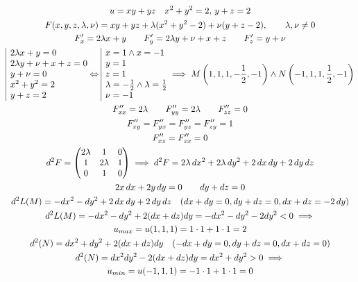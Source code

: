 \documentclass[a4paper,fleqn,12pt]{article}
\theoremstyle{definition}
\begin{document}
\begin{gather*}
u = xy+yz \quad x^2 + y^2 = 2, \, y+z = 2 \\
F(x,y,z,\lambda, \nu) = xy + yz + \lambda(x^2 + y^2 - 2) + \nu(y + z - 2), \qquad \lambda, \nu \neq 0 \\
F'_x = 2\lambda x + y \qquad F'_y = 2 \lambda y + \nu + x + z \qquad F'_z = y + \nu \\
\begin{array}{|l@{}}
2\lambda x + y = 0 \\
2 \lambda y + \nu + x + z  = 0 \\
y + \nu = 0 \\
x^2 + y^2 = 2 \\
y+z = 2 
\end{array} \Leftrightarrow 
\begin{array}{|l@{}}
x = 1 \land x = -1\\
y = 1 \\
z = 1 \\
\lambda = - \frac{1}{2} \land \lambda = \frac{1}{2} \\
\nu = -1
\end{array} \implies M \left(1,1,1,-\frac{1}{2}, -1 \right) \land N \left(-1,1,1,\frac{1}{2}, -1 \right) \\
F''_{xx} = 2\lambda \qquad F''_{yy} = 2\lambda \qquad F''_{zz} = 0 \\
F''_{xy} = F''_{yx} = F''_{yz} = F''_{zy} = 1 \\
F''_{xz} = F''_{zx} = 0 \\
d^2 F = 
\begin{pmatrix}
2\lambda & 1 & 0 \\
1 & 2\lambda & 1 \\
0 & 1 & 0
\end{pmatrix} \implies d^2 F = 2\lambda \,dx^2 + 2\lambda \,dy^2 + 2 \, dx \,dy + 2 \,dy \,dz \\
2x \,dx + 2y\,dy = 0 \qquad dy + dz = 0 \\
d^2 L(M) = -dx^2 - dy^2 + 2 \, dx \, dy + 2 \, dy \, dz \quad (dx + dy = 0, dy + dz = 0, dx + dz = -2 \, dy ) \\
d^2 L(M) = -dx^2 - dy^2 + 2 (dx + dz) dy = -dx^2 -dy^2 - 2dy^2 < 0 \implies \\
u_{max} =u(1,1,1) = 1 \cdot 1 + 1 \cdot 1 = 2\\
d^2(N) = dx^2 + dy^2 + 2(dx + dz)dy \quad (-dx + dy = 0, dy+dz = 0, dx + dz = 0)\\
d^2 (N)= dx^2 dy^2 - 2(dx + dz)dy = dx^2+dy^2 >0 \implies \\
u_{min} = u(-1,1,1) = -1 \cdot 1 + 1 \cdot 1 = 0 
\end{gather*}
\end{document}
